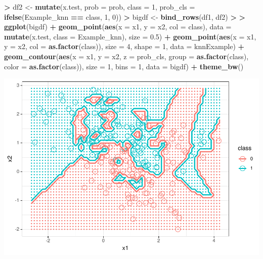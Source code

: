 \documentclass[
]{krantz}
\makeatletter
\newenvironment{Shaded}{\begin{snugshade}}{\end{snugshade}}
\newcommand{\DataTypeTok}[1]{\textcolor[rgb]{0.27,0.27,0.27}{#1}}
\newcommand{\DecValTok}[1]{\textcolor[rgb]{0.06,0.06,0.06}{#1}}
\newcommand{\ErrorTok}[1]{\textcolor[rgb]{0.14,0.14,0.14}{\textbf{#1}}}
\newcommand{\FloatTok}[1]{\textcolor[rgb]{0.06,0.06,0.06}{#1}}
\newcommand{\KeywordTok}[1]{\textcolor[rgb]{0.27,0.27,0.27}{\textbf{#1}}}
\newcommand{\NormalTok}[1]{#1}
\newcommand{\OperatorTok}[1]{\textcolor[rgb]{0.43,0.43,0.43}{\textbf{#1}}}
\newcommand{\StringTok}[1]{\textcolor[rgb]{0.5,0.5,0.5}{#1}}
\newenvironment{kframe}{%
\medskip{}
\setlength{\fboxsep}{.8em}
 \def\at@end@of@kframe{}%
 \ifinner\ifhmode%
  \def\at@end@of@kframe{\end{minipage}}%
  \begin{minipage}{\columnwidth}%
 \fi\fi%
 \def\FrameCommand##1{\hskip\@totalleftmargin \hskip-\fboxsep
 \colorbox{shadecolor}{##1}\hskip-\fboxsep
     \hskip-\linewidth \hskip-\@totalleftmargin \hskip\columnwidth}%
 \MakeFramed {\advance\hsize-\width
   \@totalleftmargin\z@ \linewidth\hsize
   \@setminipage}}%
 {\par\unskip\endMakeFramed%
 \at@end@of@kframe}
\renewenvironment{Shaded}{\begin{kframe}}{\end{kframe}}
\makeatother
\begin{document}
\begin{Shaded}
\begin{Highlighting}[]
\OperatorTok{\textgreater{}}\StringTok{ }\NormalTok{df2 \textless{}{-}}\StringTok{ }\KeywordTok{mutate}\NormalTok{(x.test, }\DataTypeTok{prob =}\NormalTok{ prob, }\DataTypeTok{class =} \DecValTok{1}\NormalTok{,  }\DataTypeTok{prob\_cls =} \KeywordTok{ifelse}\NormalTok{(Example\_knn }\OperatorTok{==}\StringTok{ }\NormalTok{class, }\DecValTok{1}\NormalTok{, }\DecValTok{0}\NormalTok{))}
\OperatorTok{\textgreater{}}\StringTok{ }\NormalTok{bigdf \textless{}{-}}\StringTok{ }\KeywordTok{bind\_rows}\NormalTok{(df1, df2)}
\OperatorTok{\textgreater{}}\StringTok{ }
\ErrorTok{\textgreater{}}\StringTok{ }\KeywordTok{ggplot}\NormalTok{(bigdf) }\OperatorTok{+}\StringTok{ }\KeywordTok{geom\_point}\NormalTok{(}\KeywordTok{aes}\NormalTok{(}\DataTypeTok{x =}\NormalTok{ x1, }\DataTypeTok{y =}\NormalTok{ x2, }\DataTypeTok{col =}\NormalTok{ class), }\DataTypeTok{data =} \KeywordTok{mutate}\NormalTok{(x.test, }\DataTypeTok{class =}\NormalTok{ Example\_knn), }\DataTypeTok{size =} \FloatTok{0.5}\NormalTok{) }\OperatorTok{+}\StringTok{ }\KeywordTok{geom\_point}\NormalTok{(}\KeywordTok{aes}\NormalTok{(}\DataTypeTok{x =}\NormalTok{ x1, }\DataTypeTok{y =}\NormalTok{ x2, }\DataTypeTok{col =} \KeywordTok{as.factor}\NormalTok{(class)), }\DataTypeTok{size =} \DecValTok{4}\NormalTok{, }\DataTypeTok{shape =} \DecValTok{1}\NormalTok{, }\DataTypeTok{data =}\NormalTok{ knnExample) }\OperatorTok{+}\StringTok{ }\KeywordTok{geom\_contour}\NormalTok{(}\KeywordTok{aes}\NormalTok{(}\DataTypeTok{x =}\NormalTok{ x1, }\DataTypeTok{y =}\NormalTok{ x2, }\DataTypeTok{z =}\NormalTok{ prob\_cls, }\DataTypeTok{group =} \KeywordTok{as.factor}\NormalTok{(class), }\DataTypeTok{color =} \KeywordTok{as.factor}\NormalTok{(class)), }\DataTypeTok{size =} \DecValTok{1}\NormalTok{, }\DataTypeTok{bins =} \DecValTok{1}\NormalTok{, }\DataTypeTok{data =}\NormalTok{ bigdf) }\OperatorTok{+}\StringTok{ }\KeywordTok{theme\_bw}\NormalTok{()}
\end{Highlighting}
\end{Shaded}

\includegraphics{bookdown_files/figure-latex/unnamed-chunk-256-1.pdf}
\end{document}
